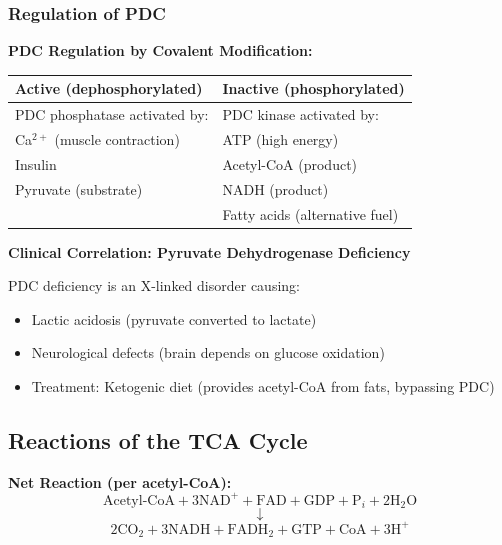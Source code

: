 \subsubsection{Regulation of PDC}

\begin{theorem}
\textbf{PDC Regulation by Covalent Modification:}

\begin{center}
\begin{tabular}{ll}
\toprule
\textbf{Active (dephosphorylated)} & \textbf{Inactive (phosphorylated)} \\
\midrule
PDC phosphatase activated by: & PDC kinase activated by: \\
\quad Ca$^{2+}$ (muscle contraction) & \quad ATP (high energy) \\
\quad Insulin & \quad Acetyl-CoA (product) \\
\quad Pyruvate (substrate) & \quad NADH (product) \\
& \quad Fatty acids (alternative fuel) \\
\bottomrule
\end{tabular}
\end{center}
\end{theorem}

\begin{clinmark}
\textbf{Clinical Correlation: Pyruvate Dehydrogenase Deficiency}

PDC deficiency is an X-linked disorder causing:
\begin{itemize}
    \item Lactic acidosis (pyruvate converted to lactate)
    \item Neurological defects (brain depends on glucose oxidation)
    \item Treatment: Ketogenic diet (provides acetyl-CoA from fats, bypassing PDC)
\end{itemize}
\end{clinmark}

\subsection{Reactions of the TCA Cycle}

\begin{center}
\begin{tcolorbox}[colback=green!5, colframe=green!70!black, title=\textbf{TCA Cycle Overview}]
\textbf{Net Reaction (per acetyl-CoA):}
\[
\text{Acetyl-CoA} + 3\text{NAD}^+ + \text{FAD} + \text{GDP} + \text{P}_i + 2\text{H}_2\text{O}
\]
\[
\downarrow
\]
\[
2\text{CO}_2 + 3\text{NADH} + \text{FADH}_2 + \text{GTP} + \text{CoA} + 3\text{H}^+
\]
\end{tcolorbox}
\end{center}

